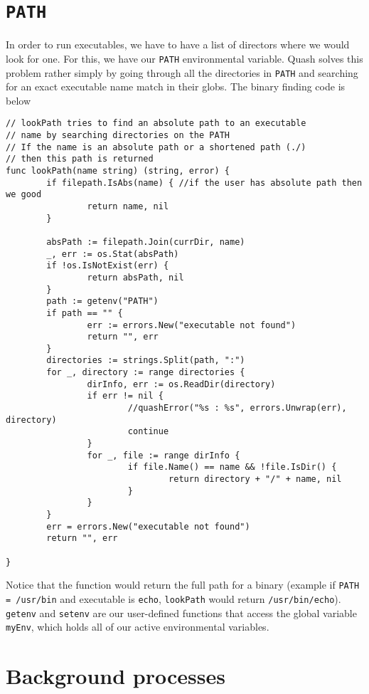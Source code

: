 \documentclass[12pt]{article}
\begin{document}
\section{\texttt{PATH}}
\label{sec:org0aed56f}
In order to run executables, we have to have a list of directors where we
would look for one. For this, we have our \texttt{PATH} environmental variable. Quash
solves this problem rather simply by going through all the directories in \texttt{PATH}
and searching for an exact executable name match in their globs. The
binary finding code is below
\begin{verbatim}
// lookPath tries to find an absolute path to an executable
// name by searching directories on the PATH
// If the name is an absolute path or a shortened path (./)
// then this path is returned
func lookPath(name string) (string, error) {
        if filepath.IsAbs(name) { //if the user has absolute path then we good
                return name, nil
        }

        absPath := filepath.Join(currDir, name)
        _, err := os.Stat(absPath)
        if !os.IsNotExist(err) {
                return absPath, nil
        }
        path := getenv("PATH")
        if path == "" {
                err := errors.New("executable not found")
                return "", err
        }
        directories := strings.Split(path, ":")
        for _, directory := range directories {
                dirInfo, err := os.ReadDir(directory)
                if err != nil {
                        //quashError("%s : %s", errors.Unwrap(err), directory)
                        continue
                }
                for _, file := range dirInfo {
                        if file.Name() == name && !file.IsDir() {
                                return directory + "/" + name, nil
                        }
                }
        }
        err = errors.New("executable not found")
        return "", err

}
\end{verbatim}
Notice that the function would return the full path for a binary (example if
\texttt{PATH = /usr/bin} and executable is \texttt{echo}, \texttt{lookPath} would return
\texttt{/usr/bin/echo}). \texttt{getenv} and \texttt{setenv} are our user-defined functions that access
the global variable \texttt{myEnv}, which holds all of our active environmental variables.
\section{Background processes}
\label{sec:org5570b4c}
\end{document}
